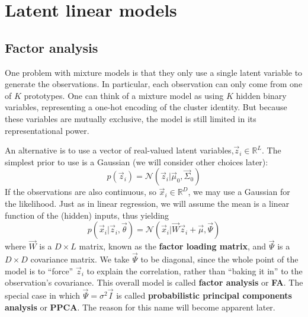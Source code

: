 \chapter{Latent linear models}


\section{Factor analysis}
One problem with mixture models is that they only use a single latent variable to generate the observations. In particular, each observation can only come from one of $K$ prototypes. One can think of a mixture model as using $K$ hidden binary variables, representing a one-hot encoding of the cluster identity. But because these variables are mutually exclusive, the model is still limited in its representational power.

An alternative is to use a vector of real-valued latent variables,$\vec{z}_i \in \mathbb{R}^L$. The simplest prior to use is a Gaussian (we will consider other choices later):
\begin{equation}\label{eqn:FA-prior}
p(\vec{z}_i)=\mathcal{N}(\vec{z}_i|\vec{\mu}_0,\vec{\Sigma}_0)
\end{equation}
If the observations are also continuous, so $\vec{x}_i \in \mathbb{R}^D$, we may use a Gaussian for the likelihood. Just as in linear regression, we will assume the mean is a linear function of the (hidden) inputs, thus yielding
\begin{equation}\label{eqn:FA-class-conditional-density}
p(\vec{x}_i|\vec{z}_i,\vec{\theta})=\mathcal{N}(\vec{x}_i|\vec{W}\vec{z}_i+\vec{\mu},\vec{\Psi})
\end{equation}
where $\vec{W}$ is a $D \times L$ matrix, known as the \textbf{factor loading matrix}, and $\vec{\Psi}$ is a $D \times D$ covariance matrix. We take $\vec{\Psi}$ to be diagonal, since the whole point of the model is to “force” $\vec{z}_i$ to explain the correlation, rather than “baking it in” to the observation’s covariance. This overall model is called \textbf{factor analysis} or \textbf{FA}. The special case in which $\vec{\Psi}=\sigma^2\vec{I}$ is called \textbf{probabilistic principal components analysis} or \textbf{PPCA}. The reason for this name will become apparent later.


